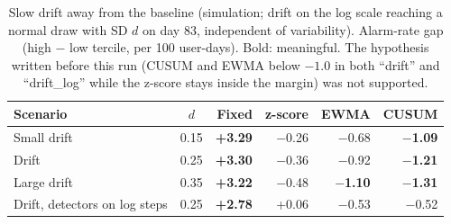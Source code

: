 \begin{table}[H]
\centering
\small
\caption{Slow drift away from the baseline (simulation; drift on the log scale reaching a normal draw with SD $d$ on day 83, independent of variability). Alarm-rate gap (high $-$ low tercile, per 100 user-days). Bold: meaningful. The hypothesis written before this run (CUSUM and EWMA below $-1.0$ in both ``drift'' and ``drift\_log'' while the z-score stays inside the margin) was not supported.}
\label{tab:drift}
\begin{tabular}{@{}lcrrrr@{}}
\toprule
Scenario & $d$ & Fixed & z-score & EWMA & CUSUM \\
\midrule
Small drift & 0.15 & \textbf{+3.29} & $-$0.26 & $-$0.68 & \textbf{$-$1.09} \\
Drift & 0.25 & \textbf{+3.30} & $-$0.36 & $-$0.92 & \textbf{$-$1.21} \\
Large drift & 0.35 & \textbf{+3.22} & $-$0.48 & \textbf{$-$1.10} & \textbf{$-$1.31} \\
Drift, detectors on log steps & 0.25 & \textbf{+2.78} & +0.06 & $-$0.53 & $-$0.52 \\
\bottomrule
\end{tabular}
\end{table}
